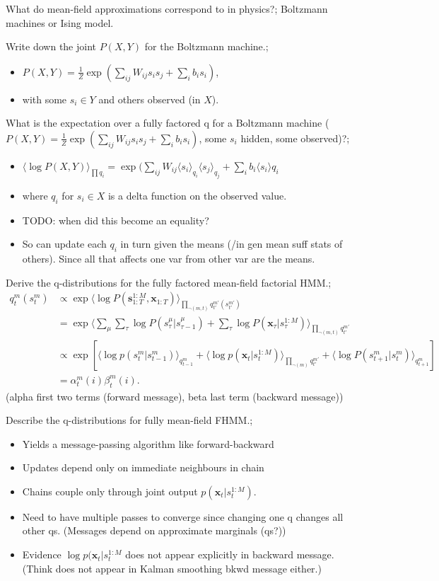 \documentclass{article}
\begin{document}
What do mean-field approximations correspond to in physics?; Boltzmann machines or Ising model.

Write down the joint $P(X,Y)$ for the Boltzmann machine.; \begin{itemize}
	\item $P(X,Y)=\frac{1}{Z}\exp(\sum_{ij}W_{ij}s_is_j+\sum_ib_is_i)$,
	\item with some $s_i\in Y$ and others observed (in $X$).
\end{itemize}

What is the expectation over a fully factored q for a Boltzmann machine ($P(X,Y)=\frac{1}{Z}\exp(\sum_{ij}W_{ij}s_is_j+\sum_ib_is_i)$, some $s_i$ hidden, some observed)?; \begin{itemize}
	\item $\langle \log P(X,Y)\rangle_{\prod q_i} =\exp(\sum_{ij}W_{ij}\langle s_i\rangle_{q_i}\langle s_j\rangle_{q_j}+\sum_ib_i\langle s_i\rangle q_i$
	\item where $q_i$ for $s_i \in X$ is a delta function on the observed value.
	\item TODO: when did this become an equality?
	\item So can update each $q_i$ in turn given the means (/in gen mean suff stats of others). Since all that affects one var from other var are the means.
\end{itemize}

Derive the q-distributions for the fully factored mean-field factorial HMM.; \begin{align*}
    q^m_t(s^m_t) &\propto \exp \langle \log P(\bm{s}^{1:M}_{1:T}, \bm{x}_{1:T})\rangle_{\prod_{\neg (m, t)}q^{m'}_{t'}(s^{m'}_{t'})} \\
    &= \exp \langle \sum_{\mu}\sum_\tau\log P(s^\mu_\tau|s^\mu_{\tau-1}) + \sum_\tau\log P(\bm{x}_\tau|s^{1:M}_\tau)\rangle_{\prod_{\neg (m, t)}q^{m'}_{t'}} \\
    &\propto \exp [\langle \log p(s^m_t|s^m_{t-1})\rangle_{q^m_{t-1}} + \langle \log p(\bm{x}_t|s^{1:M}_t)\rangle_{\prod_{\neg(m)}q^{m'}_{t'}} + \langle \log P(s^m_{t+1}|s^m_t)\rangle_{q^m_{t+1}} ]\\
    &= \alpha^m_t(i)\beta^m_t(i).
\end{align*} (alpha first two terms (forward message), beta last term (backward message))

Describe the q-distributions for fully mean-field FHMM.; \begin{itemize}
    \item Yields a message-passing algorithm like forward-backward
    \item Updates depend only on immediate neighbours in chain
    \item Chains couple only through joint output $p(\bm{x}_t|s^{1:M}_t)$.
    \item Need to have multiple passes to converge since changing one q changes all other qs. (Messages depend on approximate marginals (qs?))
    \item Evidence $\log p(\bm{x}_t|s_t^{1:M}$ does not appear explicitly in backward message. (Think does not appear in Kalman smoothing bkwd message either.)
\end{itemize}
\end{document}
